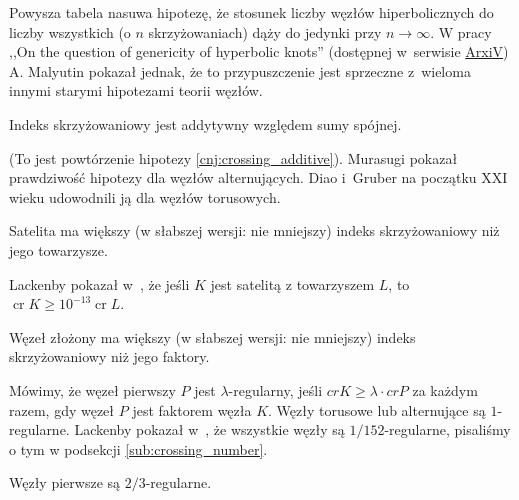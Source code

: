 Powysza tabela nasuwa hipotezę,
że stosunek liczby węzłów hiperbolicznych do liczby wszystkich
(o $n$ skrzyżowaniach) dąży do jedynki przy $n \to \infty$.
W pracy ,,On the question of genericity of hyperbolic knots'' (dostępnej w~serwisie \href{https://arxiv.org/abs/1612.03368v1}{ArxiV}) A. Malyutin pokazał jednak, że to przypuszczenie jest sprzeczne z~wieloma innymi starymi hipotezami teorii węzłów.

\begin{conjecture}
    Indeks skrzyżowaniowy jest addytywny względem sumy spójnej.
\end{conjecture}

(To jest powtórzenie hipotezy \ref{cnj:crossing_additive}).
Murasugi pokazał prawdziwość hipotezy dla węzłów alternujących.
Diao i~Gruber na początku XXI wieku udowodnili ją dla węzłów torusowych.

\begin{conjecture}
    Satelita ma większy
    (w słabszej wersji: nie mniejszy)
    indeks skrzyżowaniowy niż jego towarzysze.
\end{conjecture}

Lackenby pokazał w~\cite{lackenby14}, że jeśli $K$ jest satelitą z towarzyszem $L$, to $\operatorname{cr} K \ge 10^{-13} \operatorname{cr} L$.

\begin{conjecture}
    Węzeł złożony ma większy
    (w słabszej wersji: nie mniejszy)
    indeks skrzyżowaniowy niż jego faktory.
\end{conjecture}

Mówimy, że węzeł pierwszy $P$ jest $\lambda$-regularny,
jeśli $cr K \ge \lambda \cdot cr P$ za każdym razem,
gdy węzeł $P$ jest faktorem węzła $K$.
Węzły torusowe lub alternujące są $1$-regularne.
Lackenby pokazał w~\cite{lackenby09}, że wszystkie węzły są $1/152$-regularne, pisaliśmy o tym w podsekcji \ref{sub:crossing_number}.

\begin{conjecture}
    Węzły pierwsze są $2/3$-regularne.
\end{conjecture}




